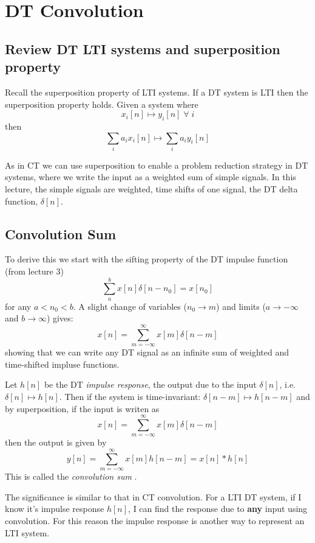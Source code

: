 \chapter{DT Convolution}

\section{Review DT LTI systems and superposition property}

Recall the superposition property of LTI systems. If a DT system is LTI then the superposition property holds. Given a system where
\[   
x_i[n] \mapsto y_i[n] \; \forall\; i
\]
then
\[
\sum\limits_{i} a_i x_i[n] \mapsto \sum\limits_{i} a_i y_i[n] 
\]

As in CT we can use superposition to enable a problem reduction strategy in DT systems, where we write the input as a weighted sum of simple signals.  In this lecture, the simple signals are weighted, time shifts of one signal, the DT delta function, $\delta[n]$.

\section{Convolution Sum}

To derive this we start with the sifting property of the DT impulse function (from lecture 3)
\[
\sum\limits_{a}^{b} x[n]\delta[n-n_0] = x[n_0]
\]
for any $a < n_0 < b$. A slight change of variables ($n_0 \rightarrow m$) and limits ($a \rightarrow -\infty$ and $b \rightarrow \infty$) gives:
\[
x[n] = \sum\limits_{m = -\infty}^{\infty} x[m]\delta[n-m]
\]
showing that we can write any DT signal as an infinite sum of weighted and time-shifted impluse functions.

Let $h[n]$ be the DT {\it impulse response}, the output due to the input $\delta[n]$, i.e. $\delta[n] \mapsto h[n]$. Then if the system is time-invariant: $\delta[n-m] \mapsto h[n-m]$ and by superposition, if the input is writen as
\[
x[n] = \sum\limits_{m = -\infty}^{\infty} x[m]\delta[n-m]
\]
then the output is given by
\[
y[n] = \sum\limits_{m = -\infty}^{\infty} x[m]h[n-m] = x[n] * h[n]
\]
This is called the \emph{convolution sum} .

The significance is similar to that in CT convolution. For a LTI DT system, if I know it's impulse response $h[n]$, I can find the response due to \textbf{any} input using convolution. For this reason the impulse response is another way to represent an LTI system.

